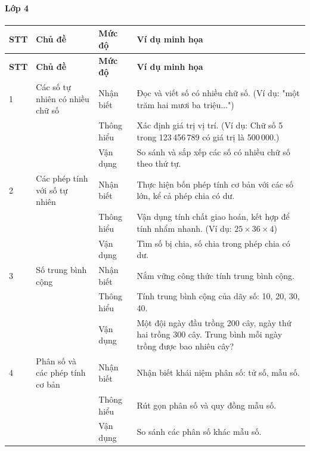 \paragraph{Lớp 4}
\renewcommand{\arraystretch}{1.3}
\begin{longtable}{|>{\centering\arraybackslash}m{0.8cm}|m{3.5cm}|>{\centering\arraybackslash}m{2cm}|m{7.5cm}|}
	\hline
	\textbf{STT} & \textbf{Chủ đề} & \textbf{Mức độ} & \textbf{Ví dụ minh họa} \\
	\hline
	\endfirsthead
	\hline
	\textbf{STT} & \textbf{Chủ đề} & \textbf{Mức độ} & \textbf{Ví dụ minh họa} \\
	\hline
	\endhead
	\hline
	\endfoot

	1 & Các số tự nhiên có nhiều chữ số
	& Nhận biết & Đọc và viết số có nhiều chữ số. (Ví dụ: "một trăm hai mươi ba triệu...") \\
	\cline{3-4}
	& & Thông hiểu & Xác định giá trị vị trí. (Ví dụ: Chữ số 5 trong 123\,456\,789 có giá trị là 500\,000.) \\
	\cline{3-4}
	& & Vận dụng & So sánh và sắp xếp các số có nhiều chữ số theo thứ tự. \\
	\hline

	2 & Các phép tính với số tự nhiên
	& Nhận biết & Thực hiện bốn phép tính cơ bản với các số lớn, kể cả phép chia có dư. \\
	\cline{3-4}
	& & Thông hiểu & Vận dụng tính chất giao hoán, kết hợp để tính nhẩm nhanh. (Ví dụ: $25 \times 36 \times 4$) \\
	\cline{3-4}
	& & Vận dụng & Tìm số bị chia, số chia trong phép chia có dư. \\
	\hline

	3 & Số trung bình cộng
	& Nhận biết & Nắm vững công thức tính trung bình cộng. \\
	\cline{3-4}
	& & Thông hiểu & Tính trung bình cộng của dãy số: 10, 20, 30, 40. \\
	\cline{3-4}
	& & Vận dụng & Một đội ngày đầu trồng 200 cây, ngày thứ hai trồng 300 cây. Trung bình mỗi ngày trồng được bao nhiêu cây? \\
	\hline

	4 & Phân số và các phép tính cơ bản
	& Nhận biết & Nhận biết khái niệm phân số: tử số, mẫu số. \\
	\cline{3-4}
	& & Thông hiểu & Rút gọn phân số và quy đồng mẫu số. \\
	\cline{3-4}
	& & Vận dụng & So sánh các phân số khác mẫu số. \\
	\hline


\end{longtable}
